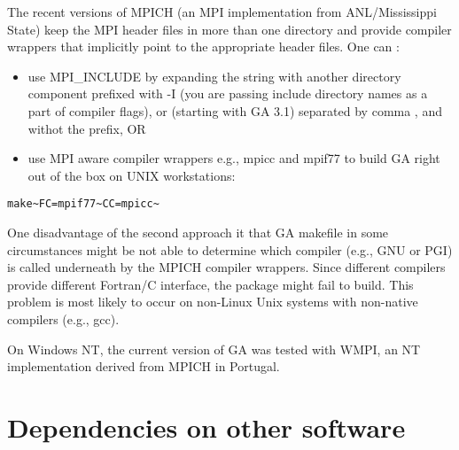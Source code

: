 The recent versions of MPICH (an MPI implementation from ANL/Mississippi
State) keep the MPI header files in more than one directory and provide
compiler wrappers that implicitly point to the appropriate header
files. One can :
\begin{itemize}
\item use MPI\_INCLUDE by expanding the string with another directory component
prefixed with \textquotedbl{}-I\textquotedbl{} (you are passing include
directory names as a part of compiler flags), or (starting with GA
3.1) separated by comma \textquotedbl{},\textquotedbl{} and withot
the prefix, OR 
\item use MPI aware compiler wrappers e.g., mpicc and mpif77 to build GA
right out of the box on UNIX workstations: \end{itemize}
\begin{verbatim}
make~FC=mpif77~CC=mpicc~
\end{verbatim}
One disadvantage of the second approach it that GA makefile in some
circumstances might be not able to determine which compiler (e.g.,
GNU or PGI) is called underneath by the MPICH compiler wrappers. Since
different compilers provide different Fortran/C interface, the package
might fail to build. This problem is most likely to occur on non-Linux
Unix systems with non-native compilers (e.g., gcc).

On Windows NT, the current version of GA was tested with WMPI, an
NT implementation derived from MPICH in Portugal. 


\section{Dependencies on other software }

